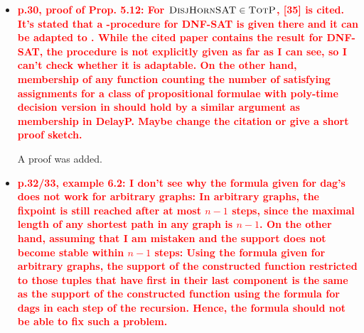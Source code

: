 \documentclass[a4paper]{article}
\newcommand{\red}[1]{{\bf\textcolor{red}{#1}}}
\begin{document}
\begin{itemize}
	\item \red{p.30, proof of Prop. 5.12: For $\textsc{DisjHornSAT} \in \text{\sc TotP}$, [35] is cited. It’s stated that a \totp-procedure for DNF-SAT is given there and it can be adapted to \dhsat. While the cited paper contains the result for DNF-SAT, the procedure is not explicitly given as far as I can see, so I can't check whether it is adaptable. On the other hand, membership of any function counting the number of satisfying assignments for a class of propositional formulae with poly-time decision version in \totp should hold by a similar argument as membership in DelayP. Maybe change the citation or give a short proof sketch.}
	
	A proof was added.
	
	\item \red{p.32/33, example 6.2: I don't see why the formula given for dag's does not work for arbitrary graphs: In arbitrary graphs, the fixpoint is still reached after at most $n-1$ steps, since the maximal length of any shortest path in any graph is $n-1$. On the other hand, assuming that I am mistaken and the support does not become stable within $n-1$ steps: Using the formula	given for arbitrary graphs, the support of the constructed function restricted to those tuples that have first in their last component is the same as the support of the constructed function using the formula for dags in each step of the recursion. Hence, the formula should not be able to fix such a problem.}
	

\end{itemize}
\end{document}
